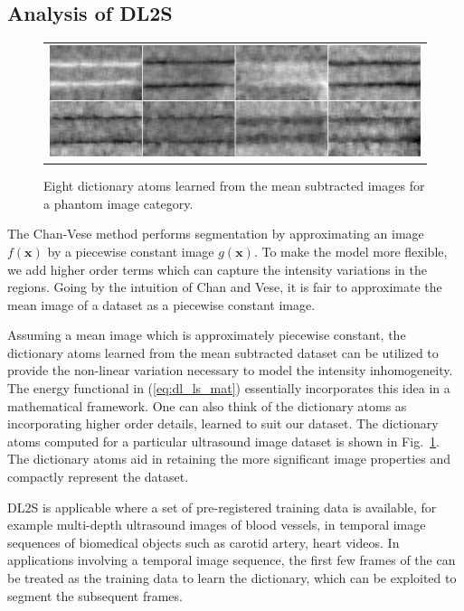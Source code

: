 \subsection{Analysis of DL2S}
\begin{figure}[th]
\centering
\renewcommand{\tabcolsep}{0.05cm}
	\begin{tabular}{@{} c@{}}
		\includegraphics[width=.9\linewidth]{./images/DL2S/dataset1_dict} 
	\end{tabular}
\caption[DL2S dictionary]{Eight dictionary atoms learned from the mean subtracted images for a phantom image category.}
\label{fig:DLbasis}
\end{figure}
The Chan-Vese method performs segmentation by approximating an image $f(\textbf{x})$ by a piecewise constant image $g(\textbf{x})$. To make the model more flexible, we  add higher order terms which can capture the intensity variations in the regions. Going by the intuition of Chan and Vese, it is fair to approximate the mean image of a dataset as a piecewise constant image.  

Assuming a mean image which is approximately piecewise constant, the dictionary atoms learned from the mean subtracted dataset can be utilized to provide the non-linear variation necessary to model the intensity inhomogeneity. The energy functional in  (\ref{eq:dl_ls_mat}) essentially incorporates this idea in a mathematical framework. One can also think of the dictionary atoms as incorporating higher order details, learned to suit our dataset. The dictionary atoms computed for a particular ultrasound image dataset is shown in Fig.~\ref{fig:DLbasis}. The dictionary atoms aid in retaining the more significant image properties  and compactly represent the dataset. 

DL2S is applicable where a set of pre-registered training data is available, for example multi-depth ultrasound images of blood vessels, in temporal image sequences of biomedical objects such as carotid artery, heart videos. In applications involving a temporal image sequence, the first few frames of the can be treated as the training data to learn the dictionary, which can be exploited to segment the subsequent frames.    

